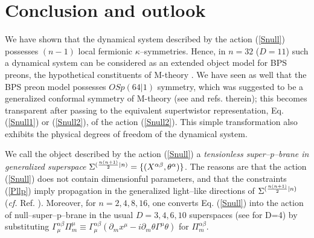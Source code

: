 \documentclass[a4paper,11pt]{article}
\begin{document}
\section{Conclusion and outlook} 


We have shown that the dynamical system described  by the action (\ref{Snull}) 
 possesses $(n-1)$ local fermionic 
$\kappa$--symmetries. Hence, in $n=32$ ($D=11$) such a dynamical system  
 can be considered as 
an extended object model for BPS preons, the hypothetical constituents 
of M-theory \cite{BPS01}. 
We have seen as well that the BPS preon model possesses  
$OSp(64|1)$ symmetry, 
which was suggested to be a generalized conformal symmetry of M-theory 
(see \cite{Bars2t,West,BPS01} and refs. therein);  
this becomes transparent after passing to the equivalent  
supertwistor representation, Eq. (\ref{Snull1}) or (\ref{Snull2}), 
of the action (\ref{Snull2}). This simple transformation  also exhibits 
the physical  degrees of freedom of the dynamical system. 


We call the object described by the action 
(\ref{Snull}) a 
{\sl tensionless super--p--brane in generalized superspace} 
 $\Sigma^{({n(n+1)\over 2}|n)}= 
\{ (X^{\alpha\beta}, \theta^{\alpha})\}$. The reasons are that  
the  action (\ref{Snull}) does not contain dimensionful parameters, and 
that the constraints (\ref{Pllp}) imply propagation in the 
generalized light--like directions of $\Sigma^{({n(n+1)\over 2}|n)}$ 
({\it cf.} Ref. \cite{V01s}). 
Moreover, for $n=2,4,8,16$, 
one converts Eq. (\ref{Snull}) into the action of null--super--p--brane 
in the usual $D=3, 4, 6, 10$ superspaces (see \cite{BZ} for D=4) by 
substituting $\Gamma_\mu^{\alpha\beta}\Pi_m^\mu
\equiv \Gamma_\mu^{\alpha\beta} (\partial_mx^\mu - i 
\partial_m\theta \Gamma^\mu \theta)$ for $\Pi_m^{\alpha\beta}$. 
\end{document}
